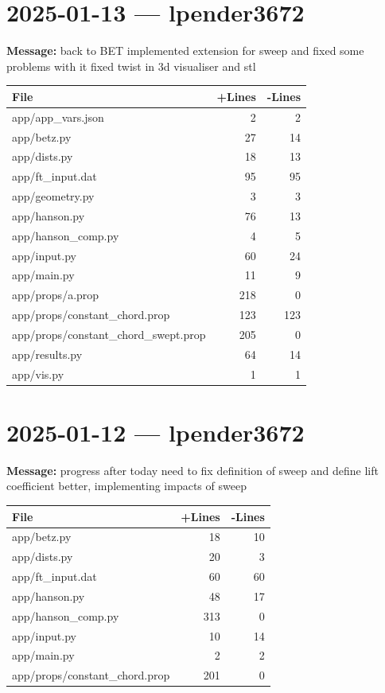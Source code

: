 \documentclass{article}
\begin{document}
\section*{2025-01-13 --- lpender3672}
\textbf{Message:} back to BET implemented extension for sweep and fixed some problems with it fixed twist in 3d visualiser and stl

\begin{longtable}{|p{10cm}|r|r|}
\hline \textbf{File} & \textbf{+Lines} & \textbf{-Lines} \\
\hline
app/app\_vars.json & 2 & 2 \\
\hline
app/betz.py & 27 & 14 \\
\hline
app/dists.py & 18 & 13 \\
\hline
app/ft\_input.dat & 95 & 95 \\
\hline
app/geometry.py & 3 & 3 \\
\hline
app/hanson.py & 76 & 13 \\
\hline
app/hanson\_comp.py & 4 & 5 \\
\hline
app/input.py & 60 & 24 \\
\hline
app/main.py & 11 & 9 \\
\hline
app/props/a.prop & 218 & 0 \\
\hline
app/props/constant\_chord.prop & 123 & 123 \\
\hline
app/props/constant\_chord\_swept.prop & 205 & 0 \\
\hline
app/results.py & 64 & 14 \\
\hline
app/vis.py & 1 & 1 \\
\hline
\end{longtable}

\section*{2025-01-12 --- lpender3672}
\textbf{Message:} progress after today need to fix definition of sweep and define lift coefficient better, implementing impacts of sweep

\begin{longtable}{|p{10cm}|r|r|}
\hline \textbf{File} & \textbf{+Lines} & \textbf{-Lines} \\
\hline
app/betz.py & 18 & 10 \\
\hline
app/dists.py & 20 & 3 \\
\hline
app/ft\_input.dat & 60 & 60 \\
\hline
app/hanson.py & 48 & 17 \\
\hline
app/hanson\_comp.py & 313 & 0 \\
\hline
app/input.py & 10 & 14 \\
\hline
app/main.py & 2 & 2 \\
\hline
app/props/constant\_chord.prop & 201 & 0 \\
\hline
\end{longtable}
\end{document}
